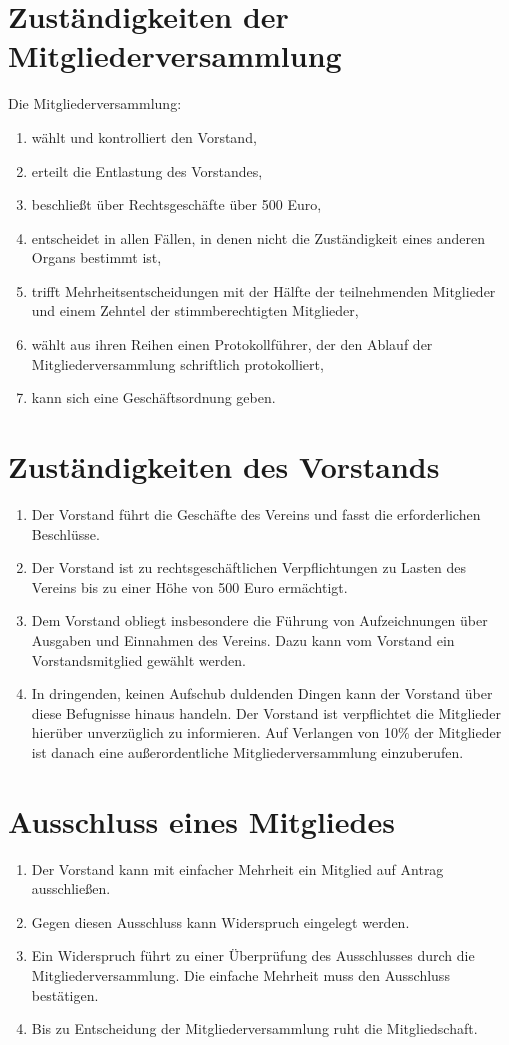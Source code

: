 \documentclass[ngerman]{article}
\begin{document}
\section{Zuständigkeiten der Mitgliederversammlung}
Die Mitgliederversammlung:
\begin{enumerate}
\item wählt und kontrolliert den Vorstand,
\item erteilt die Entlastung des Vorstandes,
\item beschließt über Rechtsgeschäfte über 500 Euro,
\item entscheidet in allen Fällen, in denen nicht die Zuständigkeit eines anderen Organs bestimmt ist,
\item trifft Mehrheitsentscheidungen mit der Hälfte der teilnehmenden Mitglieder und einem Zehntel der stimmberechtigten Mitglieder,
\item wählt aus ihren Reihen einen Protokollführer, der den Ablauf der Mitgliederversammlung schriftlich protokolliert,
\item kann sich eine Geschäftsordnung geben.
\end{enumerate}


\section{Zuständigkeiten des Vorstands}
\begin{enumerate}
  \item Der Vorstand führt die Geschäfte des Vereins und fasst die erforderlichen Beschlüsse.
  \item Der Vorstand ist zu rechtsgeschäftlichen Verpflichtungen zu Lasten des Vereins bis zu einer Höhe von 500 Euro ermächtigt.
  \item Dem Vorstand obliegt insbesondere die Führung von Aufzeichnungen über Ausgaben und Einnahmen des Vereins.
  Dazu kann vom Vorstand ein Vorstandsmitglied gewählt werden.
  \item In dringenden, keinen Aufschub duldenden Dingen kann der Vorstand über diese Befugnisse hinaus handeln.
  Der Vorstand ist verpflichtet die Mitglieder hierüber unverzüglich zu informieren.
  Auf Verlangen von 10\% der Mitglieder ist danach eine außerordentliche Mitgliederversammlung einzuberufen.
\end{enumerate}

\section{Ausschluss eines Mitgliedes}
\begin{enumerate}
\item Der Vorstand kann mit einfacher Mehrheit ein Mitglied auf Antrag ausschließen.
\item Gegen diesen Ausschluss kann Widerspruch eingelegt werden.
\item Ein Widerspruch führt zu einer Überprüfung des Ausschlusses durch die Mitgliederversammlung. Die einfache Mehrheit muss den Ausschluss
bestätigen.
\item Bis zu Entscheidung der Mitgliederversammlung ruht die Mitgliedschaft.
\end{enumerate}
\end{document}
